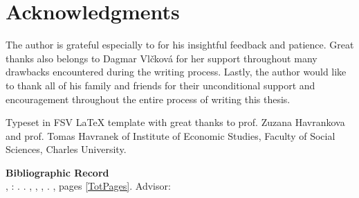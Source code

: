 \section*{Acknowledgments}
The author is grateful especially to \Supervisor for his insightful feedback
and patience. Great thanks 
also belongs to Dagmar Vlčková for her
support throughout many drawbacks encountered during the writing process. Lastly,
the author would like to thank all of his family and friends for their 
unconditional support and encouragement throughout the entire process
of writing this thesis.





\vfill

\noindent Typeset in FSV \LaTeX \hspace{0cm} template with great thanks to prof. Zuzana Havrankova and prof. Tomas Havranek of Institute of Economic Studies, Faculty of Social Sciences, Charles University. 

\bigskip

\noindent \textbf{Bibliographic Record} \\
\LastNameDP, \FirstNameDP: \emph{\Bookname}. \BookName. \CUNI, \FSS, \IES, \Place. \Year, pages \ref*{TotPages}. Advisor: \Supervisor


